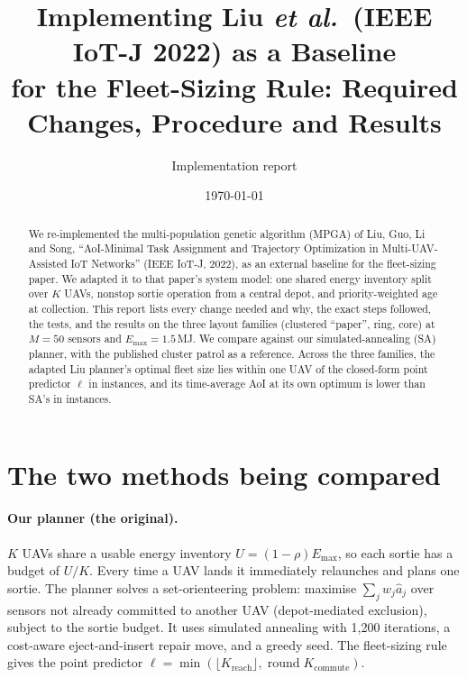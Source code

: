 \documentclass[10pt,a4paper]{article}
\title{Implementing Liu \emph{et al.}\ (IEEE IoT-J 2022) as a Baseline\\for the Fleet-Sizing Rule:
Required Changes, Procedure and Results}
\author{Implementation report}
\date{\today}
\begin{document}
\maketitle

\begin{abstract}
\noindent
We re-implemented the multi-population genetic algorithm (MPGA) of Liu, Guo, Li and Song,
``AoI-Minimal Task Assignment and Trajectory Optimization in Multi-UAV-Assisted IoT Networks'' (IEEE
IoT-J, 2022), as an external baseline for the fleet-sizing paper. We adapted it to that paper's system
model: one shared energy inventory split over $K$ UAVs, nonstop sortie operation from a central depot,
and priority-weighted age at collection. This report lists every change needed and why, the exact steps
followed, the tests, and the results on the three layout families (clustered ``paper'', ring, core) at
$M=50$ sensors and $E_{\max}=1.5$\,MJ. We compare against our simulated-annealing (SA) planner, with
the published cluster patrol as a reference. Across the three families, the adapted Liu planner's
optimal fleet size lies within one UAV of the closed-form point predictor $\ell$ in
\fiftyLiuWOneRuleAll{} instances, and its time-average AoI at its own optimum is lower than SA's in
\fiftyLiuBetterAll{} instances.
\end{abstract}

\section{The two methods being compared}

\paragraph{Our planner (the original).}
$K$ UAVs share a usable energy inventory $U=(1-\rho)E_{\max}$, so each sortie has a budget of $U/K$.
Every time a UAV lands it immediately relaunches and plans one sortie. The planner solves a
set-orienteering problem: maximise $\sum_j w_j\hat a_j$ over sensors not already committed to another
UAV (depot-mediated exclusion), subject to the sortie budget. It uses simulated annealing with 1{,}200
iterations, a cost-aware eject-and-insert repair move, and a greedy seed. The fleet-sizing rule gives the
point predictor $\ell=\min(\lfloor K_{\mathrm{reach}}\rfloor,\operatorname{round}K_{\mathrm{commute}})$.
\end{document}
